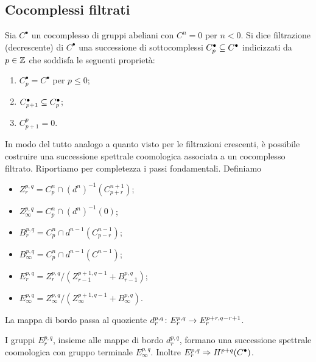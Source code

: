 \subsection{Cocomplessi filtrati}
\begin{definition}
Sia $C^\bullet$ un cocomplesso di gruppi abeliani con $C^n=0$ per $n<0$. Si dice filtrazione (decrescente) di $C^\bullet$ una successione di sottocomplessi $C_p^\bullet\subseteq C^\bullet$ indicizzati da $p\in\mathbb{Z}$ che soddisfa le seguenti proprietà:
\begin{enumerate}
\item $C_p^\bullet=C^\bullet$ per $p\le 0$;
\item $C_{p+1}^\bullet\subseteq C_p^\bullet$;
\item $C^p_{p+1}=0$.
\end{enumerate}
\end{definition}
In modo del tutto analogo a quanto visto per le filtrazioni crescenti, è possibile costruire una successione spettrale coomologica associata a un cocomplesso filtrato. Riportiamo per completezza i passi fondamentali. Definiamo
\begin{itemize}
\item $Z^{p,q}_r=C_p^n\cap (d^n)^{-1}(C_{p+r}^{n+1})$;
\item $Z^{p,q}_\infty=C_p^n\cap(d^n)^{-1}(0)$;
\item $B^{p,q}_r=C_p^n\cap d^{n-1}(C_{p-r}^{n-1})$;
\item $B^{p,q}_\infty=C_p^n\cap d^{n-1}(C^{n-1})$;
\item $E^{p,q}_r=Z^{p,q}_r/(Z^{p+1,q-1}_{r-1}+B^{p,q}_{r-1})$;
\item $E^{p,q}_\infty=Z^{p,q}_\infty/(Z^{p+1,q-1}_{\infty}+B^{p,q}_\infty)$.
\end{itemize}
La mappa di bordo passa al quoziente $d^{p,q}_r\colon E^{p,q}_r\to E^{p+r,q-r+1}_r$.
\begin{proposition}
I gruppi $E^{p,q}_r$, insieme alle mappe di bordo $d^{p,q}_r$, formano una successione spettrale coomologica con gruppo terminale $E^{p,q}_\infty$. Inoltre $E^{p,q}_r\Rightarrow H^{p+q}(C^\bullet)$.
\end{proposition}

